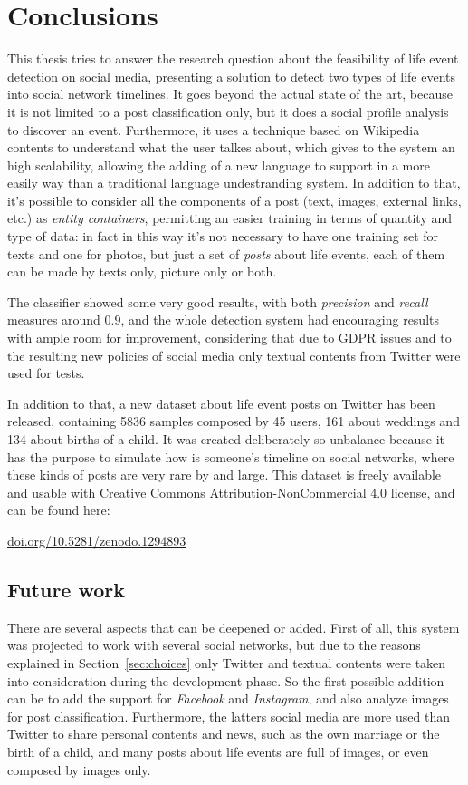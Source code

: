 \chapter{Conclusions}
\label{cha:conclusions}
This thesis tries to answer the research question about the feasibility of life event detection on social media, presenting a solution to detect two types of life events into social network timelines. It goes beyond the actual state of the art, because it is not limited to a post classification only, but it does a social profile analysis to discover an event. Furthermore, it uses a technique based on Wikipedia contents to understand what the user talkes about, which gives to the system an high scalability, allowing the adding of a new language to support in a more easily way than a traditional language undestranding system. In addition to that, it's possible to consider all the components of a post (text, images, external links, etc.) as \emph{entity containers}, permitting an easier training in terms of quantity and type of data: in fact in this way it's not necessary to have one training set for texts and one for photos, but just a set of \emph{posts} about life events, each of them can be made by texts only, picture only or both.

The classifier showed some very good results, with both \emph{precision} and \emph{recall} measures around $0.9$, and the whole detection system had encouraging results with ample room for improvement, considering that due to GDPR issues and to the resulting new policies of social media only textual contents from Twitter were used for tests.

In addition to that, a new dataset about life event posts on Twitter has been released, containing 5836 samples composed by 45 users, 161 about weddings and 134 about births of a child. It was created deliberately so unbalance because it has the purpose to simulate how is someone's timeline on social networks, where these kinds of posts are very rare by and large. This dataset is freely available and usable with Creative Commons Attribution-NonCommercial 4.0 license, and can be found here:
\begin{center}
\url{doi.org/10.5281/zenodo.1294893}
\end{center}

\section{Future work}
\label{sec:futurework}
There are several aspects that can be deepened or added. First of all, this system was projected to work with several social networks, but due to the reasons explained in Section~\ref{sec:choices} only Twitter and textual contents were taken into consideration during the development phase. So the first possible addition can be to add the support for \emph{Facebook} and \emph{Instagram}, and also analyze images for post classification. Furthermore, the latters social media are more used than Twitter to share personal contents and news, such as the own marriage or the birth of a child, and many posts about life events are full of images, or even composed by images only.

